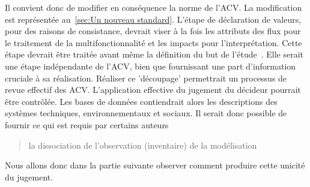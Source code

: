 Il convient donc de modifier en conséquence la norme de l'ACV.
La modification est représentée au~\ref{sec:Un nouveau standard}.
L'étape de déclaration de valeurs, pour des raisons de consistance, devrait viser à la fois les attributs des flux pour le traitement de la multifonctionnalité et les impacts pour l'interprétation.
Cette étape devrait être traitée avant même la définition du but de l'étude~\cite{patard_life_2015}.
Elle serait une étape indépendante de l'ACV, bien que fournissant une part d'information cruciale à sa réalisation.
Réaliser ce 'découpage' permettrait un processus de revue effectif des ACV.
L'application effective du jugement du décideur pourrait être contrôlée.
Les bases de données contiendrait alors les descriptions des systèmes techniques, environnementaux et sociaux.
Il serait donc possible de fournir ce qui est requis par certains auteurs \blockcquote{majeau-bettez_unified_2014}{la dissociation de l'observation (inventaire) de la modélisation}.

Nous allons donc dans la partie suivante observer comment produire cette unicité du jugement.